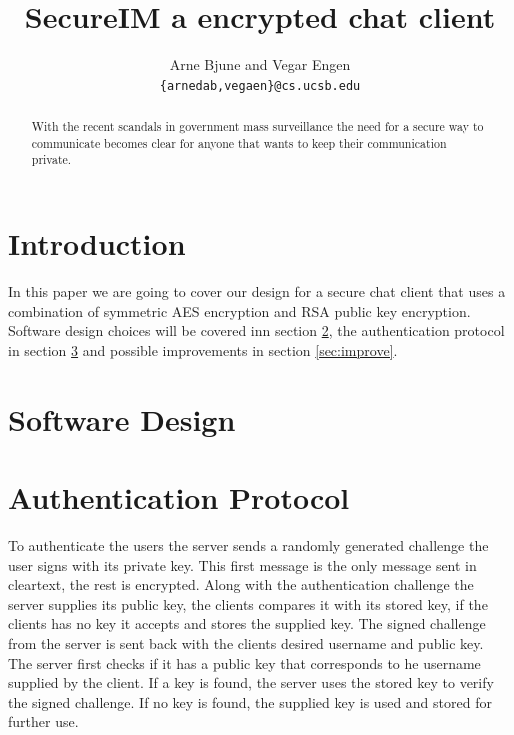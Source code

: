 \documentclass[twocolumn,11pt]{IEEEtran}
\begin{document}
\title{SecureIM a encrypted chat client}


\author{Arne Bjune and Vegar Engen \\ \texttt{\{arnedab,vegaen\}@cs.ucsb.edu}}


\maketitle

\begin{abstract}
With the recent scandals in government mass surveillance the need for a secure way to communicate becomes clear for anyone that wants to keep their communication private. 
\end{abstract}

\section {Introduction}
\label{sec:introduction}
In this paper we are going to cover our design for a secure chat client that uses a combination of symmetric AES encryption and RSA public key encryption. Software design choices will be covered inn section \ref{sec:design}, the authentication protocol in section \ref{sec:auth} and possible improvements in section \ref{sec:improve}.

\section {Software Design}
\label{sec:design}


\section{Authentication Protocol}
\label{sec:auth}
To authenticate the users the server sends a randomly generated challenge the user signs with its private key. This first message is the only message sent in cleartext, the rest is encrypted. Along with the authentication challenge the server supplies its public key, the clients compares it with its stored key, if the clients has no key it accepts and stores the supplied key. The signed challenge from the server is sent back with the clients desired username and public key. The server first checks if it has a public key that corresponds to he username supplied by the client. If a key is found, the server uses the stored key to verify the signed challenge. If no key is found, the supplied key is used and stored for further use. 
\end{document}
